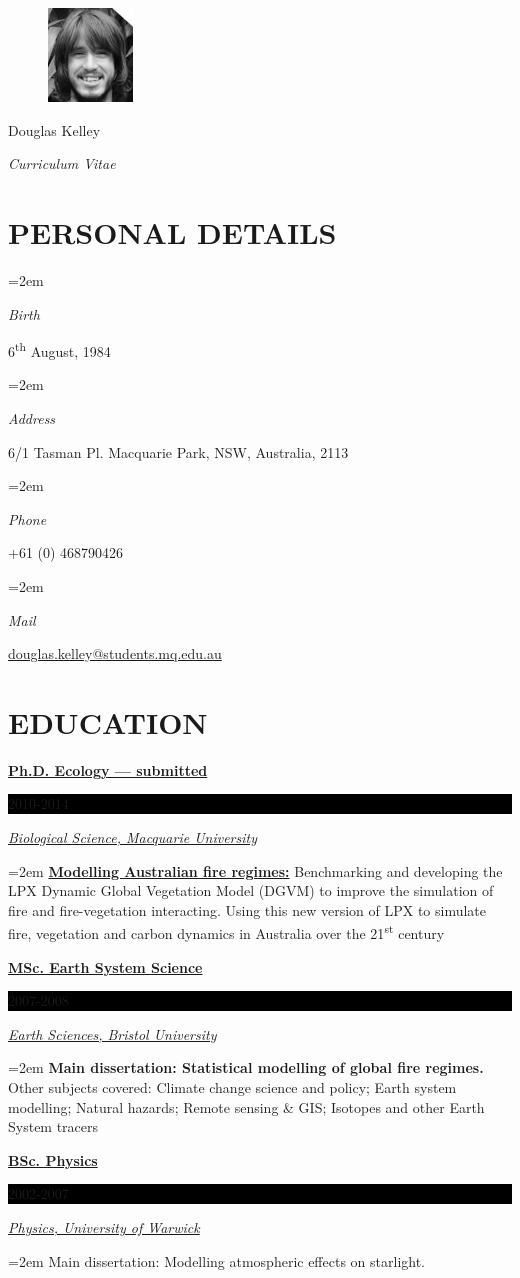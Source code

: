 \documentclass[paper=a4,fontsize=11pt]{scrartcl}	 			%
\newlength{\spacebox}
\newcommand{\sepspace}{\vspace*{1em}}			%
\newcommand{\MyName}[1]{
		\Huge \usefont{OT1}{phv}{b}{n} \hfill #1 		%
		\par \normalsize \normalfont}
\newcommand{\MySlogan}[1]{
		\large \usefont{OT1}{phv}{m}{n}\hfill \textit{#1} %
		\par \normalsize \normalfont}
\newcommand{\NewPart}[1]{\section*{\uppercase{#1}}}
\newcommand{\PersonalEntry}[2]{
		\noindent\hangindent=2em\hangafter=0 		%
		\parbox{\spacebox}{						%
		\textit{#1}}								%
		\hspace{1.5em} #2 \par}					%
\newcommand{\EducationEntry}[4]{
		\noindent \textbf{#1} \hfill 					%
		\colorbox{Black}{%
			\parbox{6.5em}{%
			\hfill\color{White}#2}} \par				%
		\noindent \textit{#3} \par					%
		\noindent\hangindent=2em\hangafter=0 \small #4 	%
		\normalsize \par}
\begin{document}
\begin{figure}
	\vspace*{-4em}
		\includegraphics[width=0.2\textwidth]{Doug-Kelley.jpg}
\end{figure}

\MyName{Douglas Kelley}
\MySlogan{Curriculum Vitae}

\sepspace

\NewPart{Personal details}{}

\PersonalEntry{Birth}{6\textsuperscript{th} August, 1984} 
\PersonalEntry{Address}{6/1 Tasman Pl. Macquarie Park, NSW, Australia, 2113}
\PersonalEntry{Phone}{+61 (0) 468790426}
\PersonalEntry{Mail}{\url{douglas.kelley@students.mq.edu.au}}

\NewPart{Education}{} 

\EducationEntry{\href{http://bcd.mq.edu.au/?page_id=171}{Ph.D. Ecology --- submitted}}{2010-2014}{\href{http://bio.mq.edu.au/}{Biological Science, Macquarie University}}
  {\textbf{\href{http://bcd.mq.edu.au/?p=361}{Modelling Australian fire regimes:}} Benchmarking and developing the LPX Dynamic Global Vegetation Model (DGVM) to improve the simulation of fire and fire-vegetation interacting. Using this new version of LPX to simulate fire, vegetation and carbon dynamics in Australia over the 21\textsuperscript{st} century}
\sepspace

\EducationEntry{\href{http://www.bristol.ac.uk/cabot/postgrad/msc-ccsp.html}
             {MSc. Earth System Science}}{2007-2008}{\href{http://www.bristol.ac.uk/earthsciences/}{Earth Sciences, Bristol University}}
  {\textbf{Main dissertation: Statistical modelling of global fire regimes.} Other subjects covered: Climate change science and policy; Earth system modelling; Natural hazards; Remote sensing \& GIS; Isotopes and other Earth System tracers}
\sepspace

\EducationEntry{\href{http://www2.warwick.ac.uk/study/undergraduate/courses/f300}{BSc. Physics}}{2002-2007}{\href{http://www2.warwick.ac.uk/fac/sci/physics/}{Physics, University of Warwick}}
  {Main dissertation: Modelling atmospheric effects on starlight.}
  
\end{document}
